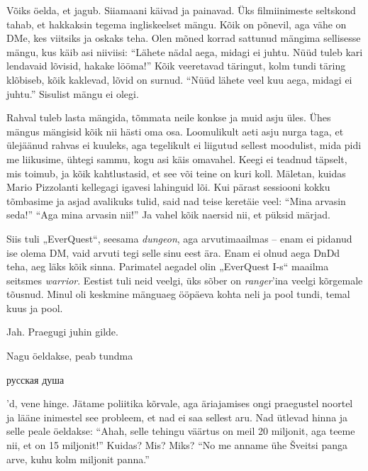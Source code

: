 
Võiks öelda, et jagub. Siiamaani käivad ja painavad. Üks filmiinimeste seltskond tahab, et hakkaksin tegema ingliskeelset mängu. Kõik 
on põnevil, aga vähe on DMe, kes viitsiks ja oskaks teha. Olen 
mõned korrad sattunud mängima sellisesse mängu, kus käib asi niiviisi: 
\enquote{Lähete nädal aega, midagi ei juhtu. Nüüd tuleb kari lendavaid lõvisid, 
hakake lööma!} Kõik veeretavad täringut, kolm tundi täring klõbiseb, kõik 
kaklevad, lõvid on surnud. \enquote{Nüüd lähete veel kuu aega, midagi ei juhtu.} 
Sisulist mängu ei olegi. 

Rahval tuleb lasta mängida, tõmmata neile konkse ja muid asju 
üles. Ühes mängus mängisid kõik nii hästi oma osa. Loomulikult 
aeti asju nurga taga, et ülejäänud rahvas ei kuuleks, aga tegelikult ei liigutud sellest 
moodulist, mida pidi me liikusime, ühtegi sammu, kogu asi käis 
omavahel. Keegi ei teadnud täpselt, mis toimub, ja kõik kahtlustasid, et see või teine on kuri 
koll. Mäletan, kuidas Mario Pizzolanti kellegagi igavesi lahinguid lõi. Kui pärast 
sessiooni kokku tõmbasime ja asjad avalikuks tulid, said nad teise keretäie veel: 
\enquote{Mina arvasin seda!} \enquote{Aga mina arvasin nii!} Ja vahel kõik 
naersid nii, et püksid märjad. 

Siis tuli „EverQuest“, seesama \emph{dungeon}, aga 
arvutimaailmas -- enam ei pidanud ise olema DM, vaid arvuti tegi selle sinu eest ära. 
Enam ei olnud aega DnDd teha, aeg läks kõik sinna. Parimatel 
aegadel olin „EverQuest I-s“ maailma seitsmes \emph{warrior}. Eestist tuli 
neid veelgi, üks sõber on \emph{ranger}'ina veelgi kõrgemale tõusnud. Minul oli 
keskmine mänguaeg ööpäeva kohta neli ja pool tundi, temal kuus ja pool. 


Jah. Praegugi juhin gilde. 


Nagu öeldakse, peab tundma \begin{russian}русская душа\end{russian}'d, vene 
hinge. Jätame poliitika 
kõrvale, aga äriajamises ongi praegustel noortel ja lääne inimestel see probleem, et 
nad ei saa sellest aru. Nad ütlevad hinna ja selle peale öeldakse: \enquote{Ahah, 
selle tehingu väärtus on meil 20 miljonit, aga teeme nii, et on 15 
miljonit!} Kuidas? Mis? Miks? \enquote{No me anname ühe Šveitsi 
panga arve, kuhu kolm miljonit panna.}

